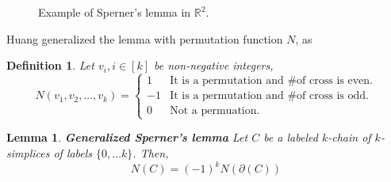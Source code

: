 \documentclass[a4paper,12pt]{article}
\newtheorem{lemma}{Lemma}
\newtheorem{definition}{Definition}
\begin{document}
\begin{figure}[!ht]
    \centering
    \caption{Example of Sperner's lemma in $\mathbb{R}^2$.}
\end{figure}

Huang generalized the lemma with permutation function $N$\cite{Huang2004ONTS},
as 

\begin{definition}
    \label{def:n_permute_function}
    Let $v_i, i \in [k]$ be non-negative integers,
    \begin{equation}
        N(v_1, v_2, \dots, v_k) = \begin{cases}
            1 &  \mbox{It is a permutation and \# of cross is even.}\\
            -1 & \mbox{It is a permutation and  \# of cross is odd.}\\
            0 & \mbox{Not a permuation.}
        \end{cases}
    \end{equation}
\end{definition}

\begin{lemma}\textbf{Generalized Sperner's lemma}
    \label{lemma:gen_sperner}
    Let $C$ be a labeled $k$-chain of $k$-simplices
    of labels $\{0, \dots k \}$. Then,
    \begin{equation}
        N(C) = (-1)^k N( \partial(C))
    \end{equation}
\end{lemma}
\end{document}
